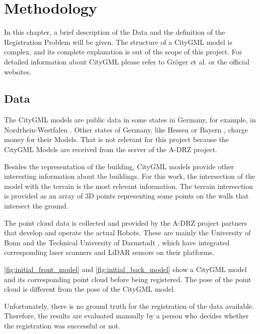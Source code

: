 

    \chapter{Methodology}
        In this chapter, a brief description of the Data and the definition of the Registration Problem will be given.
        The structure of a CityGML model is complex, and its complete explanation is out of the scope of this project.
        For detailed information about CityGML please refer to Gröger et al. \cite{Groger_2012_OGC} or the official websites.

    \section{Data}   
        The CityGML models are public data in some states in Germany, for example, in Nordrhein-Westfalen \cite{NRW3DModel_online}. 
        Other states of Germany, like Hessen \cite{Hessen3DModel_online} or Bayern \cite{Bayern3DModel_online}, charge money for their Models.
        That is not relevant for this project because the CityGML Models are received from the server of the A-DRZ project.

        Besides the representation of the building, CityGML models provide other interesting information about the buildings.
        For this work, the intersection of the model with the terrain is the most relevant information.
        The terrain intersection is provided as an array of 3D points representing some points on the walls that intersect the ground. 
        
        The point cloud data is collected and provided by the A-DRZ project partners that develop and operate the actual Robots.
        These are mainly the University of Bonn \cite{UniBonn_online} and the Technical University of Darmstadt \cite{TUDarmstadt_online},
        which have integrated corresponding laser scanners and LiDAR sensors on their platforms.

        \autoref{fig:initial_front_model} and \autoref{fig:initial_back_model} show a CityGML model and its corresponding point cloud
        before being registered. The pose of the point cloud is different from the pose of the CityGML model.
            
        Unfortunately, there is no ground truth for the registration of the data available. 
        Therefore, the results are evaluated manually by a person who decides whether the registration was successful or not.

